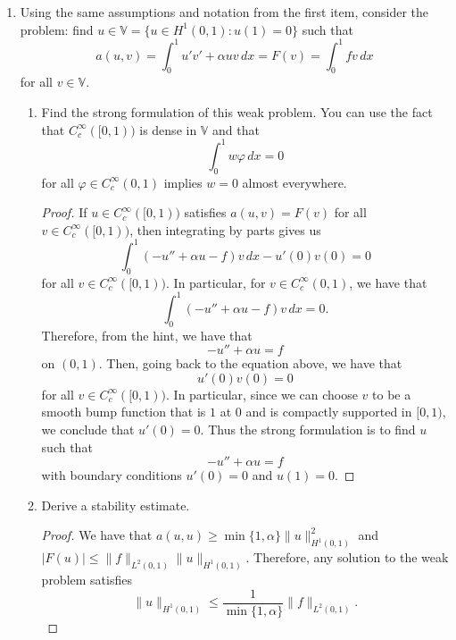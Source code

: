 \documentclass{article}
\begin{document}
\begin{enumerate}
	\item Using the same assumptions and notation from the first item, consider the problem: find $u \in \mathbb V = \{ u \in H^1(0,1) : u(1) = 0\}$ such that \[a(u,v) = \int_0^1u'v' + \alpha uv\,dx = F(v) = \int_0^1fv\,dx\] for all $v \in \mathbb V$.
	      \begin{enumerate}
		      \item Find the strong formulation of this weak problem.
		            You can use the fact that $C_c^\infty([0,1))$ is dense in $\mathbb V$ and that \[\int_0^1w\varphi\,dx = 0\] for all $\varphi \in C_c^\infty(0,1)$ implies $w = 0$ almost everywhere.
		            \begin{proof}
			            If $u \in C_c^\infty([0,1))$ satisfies $a(u,v) = F(v)$ for all $v \in C_c^\infty([0,1))$, then integrating by parts gives us \[\int_0^1(-u'' + \alpha u - f)v\,dx - u'(0)v(0) = 0\] for all $v \in C_c^\infty([0,1))$.
			            In particular, for $v \in C_c^\infty(0,1)$, we have that \[\int_0^1(-u'' + \alpha u - f)v\,dx = 0.\]
			            Therefore, from the hint, we have that \[-u'' + \alpha u = f\] on $(0,1)$.
			            Then, going back to the equation above, we have that \[u'(0)v(0)=0\] for all $v \in C_c^\infty([0,1))$.
			            In particular, since we can choose $v$ to be a smooth bump function that is $1$ at $0$ and is compactly supported in $[0,1)$, we conclude that $u'(0) = 0$.
			            Thus the strong formulation is to find $u$ such that \[-u'' + \alpha u = f\] with boundary conditions $u'(0) = 0$ and $u(1) = 0$.
		            \end{proof}
		      \item Derive a stability estimate.
		            \begin{proof}
			            We have that $a(u,u) \geq \min\{1,\alpha\}\|u\|_{H^1(0,1)}^2$ and $|F(u)| \leq \|f\|_{L^2(0,1)}\|u\|_{H^1(0,1)}$.
			            Therefore, any solution to the weak problem satisfies \[\|u\|_{H^1(0,1)} \leq \frac{1}{\min\{1,\alpha\}}\|f\|_{L^2(0,1)}.\]
		            \end{proof}
	      \end{enumerate}
\end{enumerate}
\end{document}
